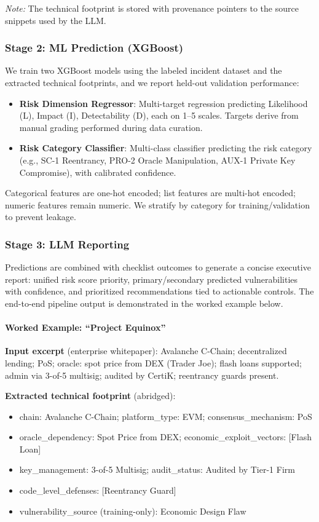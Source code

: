 \textit{Note:} The technical footprint is stored with provenance pointers to the source snippets used by the LLM.

\subsubsection{Stage 2: ML Prediction (XGBoost)}
We train two XGBoost models using the labeled incident dataset and the extracted technical footprints, and we report held-out validation performance:
\begin{itemize}
    \item \textbf{Risk Dimension Regressor}: Multi-target regression predicting Likelihood (L), Impact (I), Detectability (D), each on 1--5 scales. Targets derive from manual grading performed during data curation.
    \item \textbf{Risk Category Classifier}: Multi-class classifier predicting the risk category (e.g., SC-1 Reentrancy, PRO-2 Oracle Manipulation, AUX-1 Private Key Compromise), with calibrated confidence.
\end{itemize}
Categorical features are one-hot encoded; list features are multi-hot encoded; numeric features remain numeric. We stratify by category for training/validation to prevent leakage.

\subsubsection{Stage 3: LLM Reporting}
Predictions are combined with checklist outcomes to generate a concise executive report: unified risk score priority, primary/secondary predicted vulnerabilities with confidence, and prioritized recommendations tied to actionable controls. The end-to-end pipeline output is demonstrated in the worked example below.

\paragraph{Worked Example: ``Project Equinox''}
\textbf{Input excerpt} (enterprise whitepaper): Avalanche C-Chain; decentralized lending; PoS; oracle: spot price from DEX (Trader Joe); flash loans supported; admin via 3-of-5 multisig; audited by CertiK; reentrancy guards present.

\textbf{Extracted technical footprint} (abridged):
\begin{itemize}
    \item chain: Avalanche C-Chain; platform\_type: EVM; consensus\_mechanism: PoS
    \item oracle\_dependency: Spot Price from DEX; economic\_exploit\_vectors: [Flash Loan]
    \item key\_management: 3-of-5 Multisig; audit\_status: Audited by Tier-1 Firm
    \item code\_level\_defenses: [Reentrancy Guard]
    \item vulnerability\_source (training-only): Economic Design Flaw
\end{itemize}

